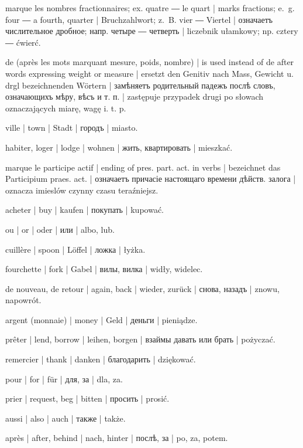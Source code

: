 \begin{ekzvocab}{1em}
 marque les nombres fractionnaires; ex.  quatre ―  le quart | marks fractions; e.~g.  four ―  a fourth, quarter | Bruchzahlwort; z.~B.  vier ―  Viertel | означаетъ числительное дробное; напр.  четыре ―  четверть | liczebnik ułamkowy; np.  cztery ―  ćwierć.

 de (après les mots marquant mesure, poids, nombre) | is used instead of de after words expressing weight or measure | ersetzt den Genitiv nach Mass, Gewicht u. drgl bezeichnenden Wörtern | замѣняетъ родительный падежъ послѣ словъ, означающихъ мѣру, вѣсъ и т. п. | zastępuje przypadek drugi po słowach oznaczających miarę, wagę i. t. p.

 ville | town | Stadt | городъ | miasto.

 habiter, loger | lodge | wohnen | жить, квартировать | mieszkać.

 marque le participe actif | ending of pres. part. act. in verbs | bezeichnet das Participium praes. act. | означаетъ причасіе настоящаго времени дѣйств. залога | oznacza imieslów czynny czasu teraźniejsz.

 acheter | buy | kaufen | покупать | kupować.

 ou | or | oder | или | albo, lub.

 cuillère | spoon | Löffel | ложка | łyżka.

 fourchette | fork | Gabel | вилы, вилка | widły, widelec.

 de nouveau, de retour | again, back | wieder, zurück | снова, назадъ | znowu, napowrót.

 argent (monnaie) | money | Geld | деньги | pieniądze.

 prêter | lend, borrow | leihen, borgen | взаймы давать или брать | pożyczać.

 remercier | thank | danken | благодарить | dziękować.

 pour | for | für | для, за | dla, za.

 prier | request, beg | bitten | просить | prosić.

 aussi | also | auch | также | także.

 après | after, behind | nach, hinter | послѣ, за | po, za, potem.


\end{ekzvocab}
